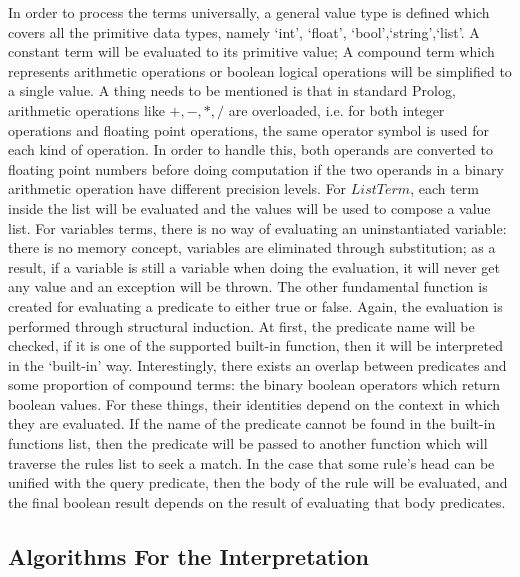 \documentclass[11pt,a4paper]{report}
\begin{document}
In order to process the terms universally, a general value type is defined which covers all the primitive data types, namely `int', `float', `bool',`string',`list'. A constant term will be evaluated to its primitive value; A compound term which represents arithmetic operations or boolean logical operations will be simplified to a single value. A thing needs to be mentioned is that in standard Prolog, arithmetic operations like $+,-,*,/$ are overloaded, i.e. for both integer operations and floating point operations, the same operator symbol is used for each kind of operation. In order to handle this, both operands are converted to floating point numbers before doing computation if the two operands in a binary arithmetic operation have different precision levels. For $ListTerm$, each term inside the list will be evaluated and the values will be used to compose a value list. For variables terms, there is no way of evaluating an uninstantiated variable: there is no memory concept, variables are eliminated through substitution; as a result, if a variable is still a variable when doing the evaluation, it will never get any value and an exception will be thrown.
\bigskip
The other fundamental function is created for evaluating a predicate to either true or false. Again, the evaluation is performed through structural induction. At first, the predicate name will be checked, if it is one of the supported built-in function, then it will be interpreted in the `built-in' way. Interestingly, there exists an overlap between predicates and some proportion of compound terms: the binary boolean operators which return boolean values. For these things, their identities depend on the context in which they are evaluated. If the name of the predicate cannot be found in the built-in functions list, then the predicate will be passed to another function which will traverse the rules list to seek a match. In the case that some rule's head can be unified with the query predicate, then the body of the rule will be evaluated, and the final boolean result depends on the result of evaluating that body predicates. 

\bigskip
\subsection*{Algorithms For the Interpretation}
\end{document}
